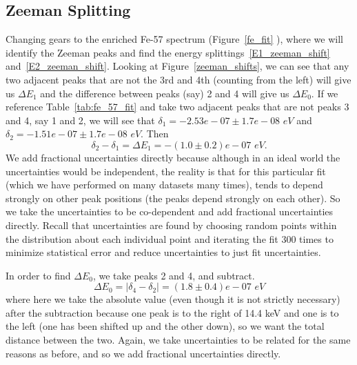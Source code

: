 \documentclass[reprint, nobibnotes, amssymb, amsmath, amsfonts, mathtools, mathrsfs, floatfix]{revtex4-1}
\begin{document}
    \subsection{Zeeman Splitting}
      Changing gears to the enriched Fe-57 spectrum (Figure~\ref{fe_fit} ), where we will identify the Zeeman peaks and find the energy splittings~\ref{E1_zeeman_shift} and~\ref{E2_zeeman_shift}.  Looking at Figure~\ref{zeeman_shifts}, we can see that any two adjacent peaks that are not the 3rd and 4th (counting from the left) will give us $\Delta E_1$ and the difference between peaks (say) 2 and 4 will give us $\Delta E_0$.  If we reference Table~\ref{tab:fe_57_fit} and take two adjacent peaks that are not peaks 3 and 4, say 1 and 2, we will see that $\delta_1 = -2.53e-07 \pm 1.7e-08 \,\, eV$ and $\delta_2 = -1.51e-07 \pm 1.7e-08 \,\, eV$.  Then
      \begin{equation}
        \delta_2 - \delta_1 = \Delta E_1 = -(1.0\pm0.2)e-07 \,\, eV.
      \end{equation}
      We add fractional uncertainties directly because although in an ideal world the uncertainties would be independent, the reality is that for this particular fit (which we have performed on many datasets many times), tends to depend strongly on other peak positions (the peaks depend strongly on each other).  So we take the uncertainties to be co-dependent and add fractional uncertainties directly.  Recall that uncertainties are found by choosing random points within the distribution about each individual point and iterating the fit 300 times to minimize statistical error and reduce uncertainties to just fit uncertainties.

      In order to find $\Delta E_0$, we take peaks 2 and 4, and subtract.
      \begin{equation}
        \Delta E_0 = |\delta_4 - \delta_2| = (1.8\pm0.4)e-07 \,\, eV
      \end{equation}
      where here we take the absolute value (even though it is not strictly necessary) after the subtraction because one peak is to the right of 14.4 keV and one is to the left (one has been shifted up and the other down), so we want the total distance between the two.  Again, we take uncertainties to be related for the same reasons as before, and so we add fractional uncertainties directly.
\end{document}
